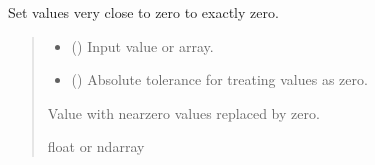 \documentclass[letterpaper,10pt,english]{sphinxhowto}
\begin{document}
\begin{fulllineitems}
\label{\detokenize{stuff:neurora.stuff.limtozero}}
\pysigstartsignatures
{}
\pysigstopsignatures
\sphinxAtStartPar
Set values very close to zero to exactly zero.
\begin{quote}\begin{description}
\begin{itemize}
\item {} 
\sphinxAtStartPar
{} () \textendash{} Input value or array.

\item {} 
\sphinxAtStartPar
{} (\sphinxstyleliteralemphasis{\sphinxupquote{, }}) \textendash{} Absolute tolerance for treating values as zero.

\end{itemize}

\sphinxAtStartPar
{} \textendash{} Value with near\sphinxhyphen{}zero values replaced by zero.

\sphinxAtStartPar
float or ndarray

\end{description}\end{quote}

\end{fulllineitems}

\end{document}
